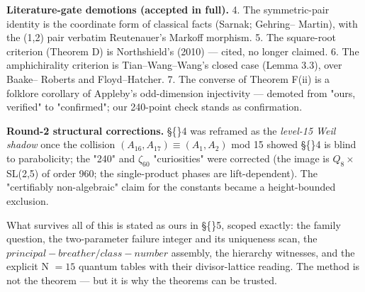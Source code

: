 \documentclass[11pt]{article}
\theoremstyle{plain}
\theoremstyle{definition}
\theoremstyle{remark}
\begin{document}
\textbf{Literature-gate demotions (accepted in full).} 4. The symmetric-pair identity is the coordinate form of classical facts (Sarnak; Gehring– Martin), with the (1,2) pair verbatim Reutenauer's Markoff morphism. 5. The square-root criterion (Theorem D) is Northshield's (2010) — cited, no longer claimed. 6. The amphichirality criterion is Tian–Wang–Wang's closed case (Lemma 3.3), over Baake– Roberts and Floyd–Hatcher. 7. The converse of Theorem F(ii) is a folklore corollary of Appleby's odd-dimension injectivity — demoted from "ours, verified" to "confirmed"; our 240-point check stands as confirmation.

\textbf{Round-2 structural corrections.} \S\{\}4 was reframed as the \emph{level-15 Weil shadow} once the collision \((A_{16},A_{17}) \equiv  (A_{1},A_{2})\) mod 15 showed \S\{\}4 is blind to parabolicity; the "240" and \(\zeta _{60}\) "curiosities" were corrected (the image is \(Q_{8} \times \) SL(2,5) of order 960; the single-product phases are lift-dependent). The "certifiably non-algebraic" claim for the constants became a height-bounded exclusion.

What survives all of this is stated as ours in \S\{\}5, scoped exactly: the family question, the two-parameter failure integer and its uniqueness scan, the \(principal-breather/class-number\) assembly, the hierarchy witnesses, and the explicit N \(= 15\) quantum tables with their divisor-lattice reading. The method is not the theorem — but it is why the theorems can be trusted.
\end{document}
